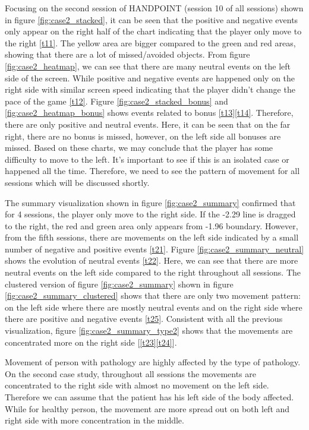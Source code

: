 Focusing on the second session of HANDPOINT (session 10 of all sessions) shown in figure \ref{fig:case2_stacked}, it can be seen that the positive and negative events only appear on the right half of the chart indicating that the player only move to the right \ref{t11}. The yellow area are bigger compared to the green and red areas, showing that there are a lot of missed/avoided objects. From figure \ref{fig:case2_heatmap}, we can see that there are many neutral events on the left side of the screen. While positive and negative events are happened only on the right side with similar screen speed indicating that the player didn't change the pace of the game \ref{t12}. Figure \ref{fig:case2_stacked_bonus} and \ref{fig:case2_heatmap_bonus} shows events related to bonus \ref{t13}\ref{t14}. Therefore, there are only positive and neutral events. Here, it can be seen that on the far right, there are no bonus is missed, however, on the left side all bonuses are missed. Based on these charts, we may conclude that the player has some difficulty to move to the left. It's important to see if this is an isolated case or happened all the time. Therefore, we need to see the pattern of movement for all sessions which will be discussed shortly.

The summary visualization shown in figure \ref{fig:case2_summary} confirmed that for 4 sessions, the player only move to the right side. If the -2.29 line is dragged to the right, the red and green area only appears from -1.96 boundary. However, from the fifth sessions, there are movements on the left side indicated by a small number of negative and positive events \ref{t21}. Figure \ref{fig:case2_summary_neutral} shows the evolution of neutral events \ref{t22}. Here, we can see that there are more neutral events on the left side compared to the right throughout all sessions. The clustered version of figure \ref{fig:case2_summary} shown in figure \ref{fig:case2_summary_clustered} shows that there are only two movement pattern: on the left side where there are mostly neutral events and on the right side where there are positive and negative events \ref{t25}. Consistent with all the previous visualization, figure \ref{fig:case2_summary_type2} shows that the movements are concentrated more on the right side [\ref{t23}\ref{t24}].

Movement of person with pathology are highly affected by the type of pathology. On the second case study, throughout all sessions the movements are concentrated to the right side with almost no movement on the left side. Therefore we can assume that the patient has his left side of the body affected. While for healthy person, the movement are more spread out on both left and right side with more concentration in the middle.


